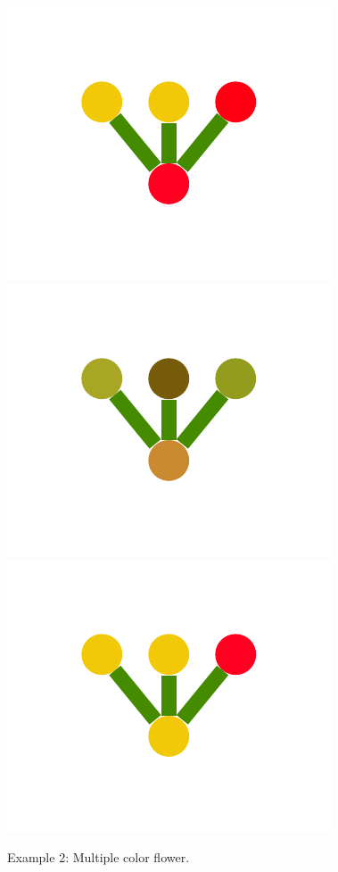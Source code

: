 \documentclass[a4paper,10pt]{article}
\begin{document}
\begin{figure}
{    \includegraphics[scale=.2]{../figures/vector/6-2-multiple-color-flower-induced-6.pdf}
    \includegraphics[scale=.2]{../figures/vector/6-2-multiple-color-flower-induced-7.pdf}
    \includegraphics[scale=.2]{../figures/vector/6-2-multiple-color-flower-induced-8.pdf}
    \label{fig:exp-multiple-flower-induced}    
    }
  \caption{Example 2: Multiple color flower.}
  \label{fig:exp-multiple-flower}
\end{figure}
\end{document}
